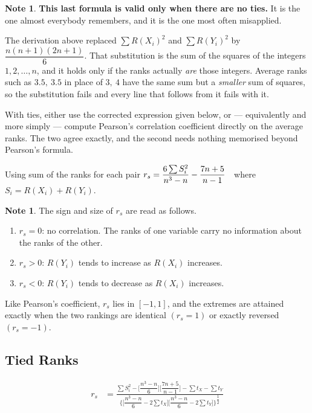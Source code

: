 \documentclass[11pt,a4paper]{article}
\theoremstyle{definition}
\newtheorem{note}[thm]{Note}
\begin{document}
\begin{note}
\textbf{This last formula is valid only when there are no ties.} It is the one
almost everybody remembers, and it is the one most often misapplied.

The derivation above replaced $\sum R(X_i)^2$ and $\sum R(Y_i)^2$ by
$\dfrac{n(n+1)(2n+1)}{6}$. That substitution is the sum of the squares of the
integers $1, 2, \ldots, n$, and it holds only if the ranks actually \emph{are}
those integers. Average ranks such as $3.5,\ 3.5$ in place of $3,\ 4$ have the
same sum but a \emph{smaller} sum of squares, so the substitution fails and every
line that follows from it fails with it.

With ties, either use the corrected expression given below, or --- equivalently and
more simply --- compute Pearson's correlation coefficient directly on the average
ranks. The two agree exactly, and the second needs nothing memorised beyond
Pearson's formula.
\end{note}
Using sum of the ranks for each pair \hspace{0.2cm}$\displaystyle{r_s=\frac{6\sum S^2_i}{n^3-n}-\frac{7n+5}{n-1}}\hspace{0.2cm}$ where \hspace{0.2cm}$S_i=R(X_i)+R(Y_i).$\\

\begin{note}
The sign and size of $r_s$ are read as follows.
\begin{enumerate}
\item[(i).] $r_s=0$: no correlation. The ranks of one variable carry no
information about the ranks of the other.
\item[(ii).] $r_s>0$: $R(Y_i)$ tends to increase as $R(X_i)$ increases.
\item[(iii).] $r_s<0$: $R(Y_i)$ tends to decrease as $R(X_i)$ increases.
\end{enumerate}
Like Pearson's coefficient, $r_s$ lies in $[-1,1]$, and the extremes are attained
exactly when the two rankings are identical $(r_s=1)$ or exactly reversed
$(r_s=-1)$.
\end{note}












\subsection{Tied Ranks}
\begin{align*}
r_s &=\frac{\sum S_i^2-\Big[\dfrac{n^3-n}{6}\Big]\Big[\dfrac{7n+5}{n-1}\Big]-\sum t_X-\sum t_Y}{\Bigg\{\Big[\dfrac{n^3-n}{6}-2\sum t_X\Big]\Big[\dfrac{n^3-n}{6}-2\sum t_Y\Big]\Bigg\}^{\dfrac{1}{2}}}\\
\end{align*}
\end{document}
